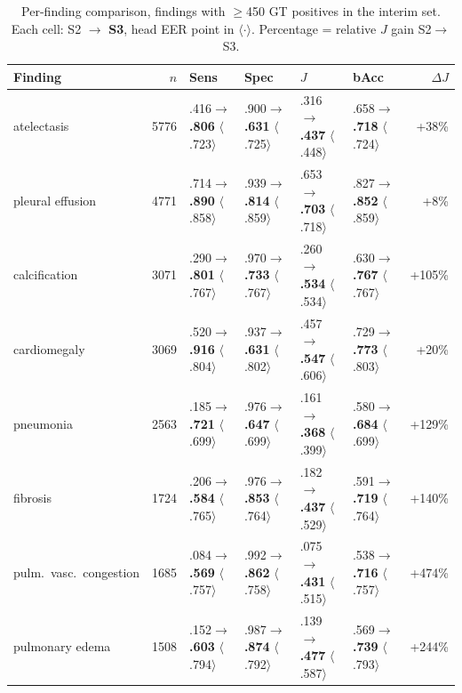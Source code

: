\documentclass[10pt,a4paper]{article}
\begin{document}
\begin{table}[h]
\centering\footnotesize
\caption{Per-finding comparison, findings with $\geq$450 GT positives in the interim
set. Each cell: S2 $\to$ \textbf{S3}, head EER point in $\langle\cdot\rangle$.
Percentage = relative $J$ gain S2$\to$S3.}
\setlength{\tabcolsep}{4pt}
\begin{tabular}{lrllllr}
\toprule
Finding & $n$ & Sens & Spec & $J$ & bAcc & $\Delta J$ \\
\midrule
atelectasis & 5776 & .416$\to$\textbf{.806} $\langle$.723$\rangle$ & .900$\to$\textbf{.631} $\langle$.725$\rangle$ & .316$\to$\textbf{.437} $\langle$.448$\rangle$ & .658$\to$\textbf{.718} $\langle$.724$\rangle$ & +38\% \\
pleural effusion & 4771 & .714$\to$\textbf{.890} $\langle$.858$\rangle$ & .939$\to$\textbf{.814} $\langle$.859$\rangle$ & .653$\to$\textbf{.703} $\langle$.718$\rangle$ & .827$\to$\textbf{.852} $\langle$.859$\rangle$ & +8\% \\
calcification & 3071 & .290$\to$\textbf{.801} $\langle$.767$\rangle$ & .970$\to$\textbf{.733} $\langle$.767$\rangle$ & .260$\to$\textbf{.534} $\langle$.534$\rangle$ & .630$\to$\textbf{.767} $\langle$.767$\rangle$ & +105\% \\
cardiomegaly & 3069 & .520$\to$\textbf{.916} $\langle$.804$\rangle$ & .937$\to$\textbf{.631} $\langle$.802$\rangle$ & .457$\to$\textbf{.547} $\langle$.606$\rangle$ & .729$\to$\textbf{.773} $\langle$.803$\rangle$ & +20\% \\
pneumonia & 2563 & .185$\to$\textbf{.721} $\langle$.699$\rangle$ & .976$\to$\textbf{.647} $\langle$.699$\rangle$ & .161$\to$\textbf{.368} $\langle$.399$\rangle$ & .580$\to$\textbf{.684} $\langle$.699$\rangle$ & +129\% \\
fibrosis & 1724 & .206$\to$\textbf{.584} $\langle$.765$\rangle$ & .976$\to$\textbf{.853} $\langle$.764$\rangle$ & .182$\to$\textbf{.437} $\langle$.529$\rangle$ & .591$\to$\textbf{.719} $\langle$.764$\rangle$ & +140\% \\
pulm.\ vasc.\ congestion & 1685 & .084$\to$\textbf{.569} $\langle$.757$\rangle$ & .992$\to$\textbf{.862} $\langle$.758$\rangle$ & .075$\to$\textbf{.431} $\langle$.515$\rangle$ & .538$\to$\textbf{.716} $\langle$.757$\rangle$ & +474\% \\
pulmonary edema & 1508 & .152$\to$\textbf{.603} $\langle$.794$\rangle$ & .987$\to$\textbf{.874} $\langle$.792$\rangle$ & .139$\to$\textbf{.477} $\langle$.587$\rangle$ & .569$\to$\textbf{.739} $\langle$.793$\rangle$ & +244\% \\

\end{tabular}
\end{table}
\end{document}
